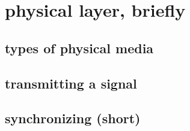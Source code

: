 
\section{physical layer, briefly}

\subsection{types of physical media}


\subsection{transmitting a signal}


\subsection{synchronizing (short)}


